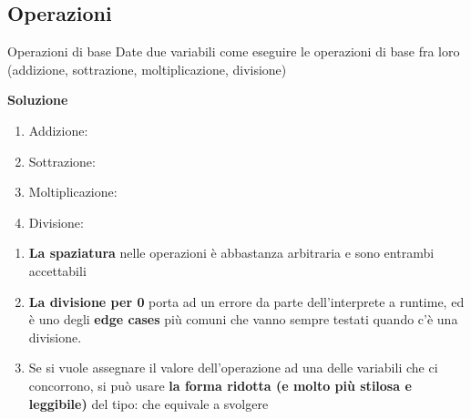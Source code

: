 \documentclass[10pt]{article}
\makeatletter
\newcommand{\<}{\langle}
\renewcommand{\>}{\rangle}
\renewenvironment{proof}[1][\proofname] {\par\pushQED{\qed}
\renewcommand*{\proofname}{Soluzione}
{\normalfont\sffamily\bfseries\topsep6\p@\@plus6\p@\relax #1\@addpunct{.} }}{\popQED\endtrivlist\@endpefalse}
\theoremstyle{mystyle}{\newtheorem*{remark}{Nota}}
\theoremstyle{mystyle}{\newtheorem*{remarks}{Note}}
\theoremstyle{mystyle}{\newtheorem*{example}{Esempio}}
\theoremstyle{mystyle}{\newtheorem*{examples}{Esempi}}
\theoremstyle{definition}{\newtheorem*{exercise}{Exercise}}
\theoremstyle{warn}
\makeatother
\begin{document}
\subsection{Operazioni}
\begin{definition}{Operazioni di base}{}
Date due variabili  come eseguire le operazioni di base fra loro (addizione, sottrazione, moltiplicazione, divisione)
\end{definition}
\begin{proof}
\begin{enumerate}
    \item Addizione: 
    \item Sottrazione: 
    \item Moltiplicazione: 
    \item Divisione: 
\end{enumerate}
\end{proof}
\begin{remarks} \leavevmode
\begin{enumerate} 
    \item \textbf{La spaziatura} nelle operazioni è abbastanza arbitraria  e  sono entrambi accettabili
    \item \textbf{La divisione per 0} porta ad un errore da parte dell'interprete a runtime, ed è uno degli \textbf{edge cases} più comuni che vanno sempre testati quando c'è una divisione.
    \item Se si vuole assegnare il valore dell'operazione ad una delle variabili che ci concorrono, si può usare \textbf{la forma ridotta (e molto più stilosa e leggibile)} del tipo:  che equivale a svolgere 
\end{enumerate}
\end{remarks}
\end{document}
